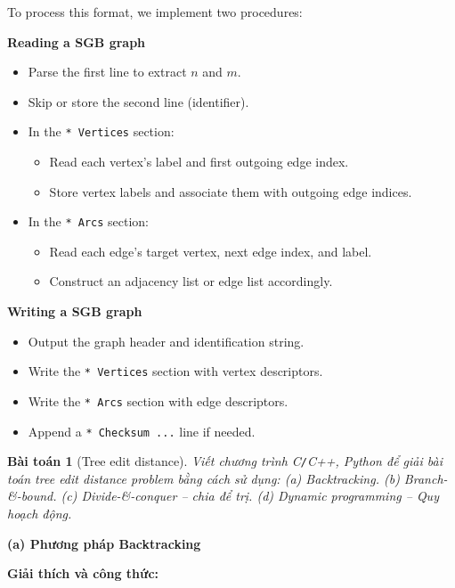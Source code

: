 \documentclass{article}
\newtheorem{baitoan}{Bài toán}
\begin{document}
To process this format, we implement two procedures:

\textbf{Reading a SGB graph}
\begin{itemize}
    \item Parse the first line to extract $n$ and $m$.
    \item Skip or store the second line (identifier).
    \item In the \texttt{* Vertices} section:
    \begin{itemize}
        \item Read each vertex’s label and first outgoing edge index.
        \item Store vertex labels and associate them with outgoing edge indices.
    \end{itemize}
    \item In the \texttt{* Arcs} section:
    \begin{itemize}
        \item Read each edge’s target vertex, next edge index, and label.
        \item Construct an adjacency list or edge list accordingly.
    \end{itemize}
\end{itemize}

\textbf{Writing a SGB graph}
\begin{itemize}
    \item Output the graph header and identification string.
    \item Write the \texttt{* Vertices} section with vertex descriptors.
    \item Write the \texttt{* Arcs} section with edge descriptors.
    \item Append a \texttt{* Checksum ...} line if needed.
\end{itemize}

\begin{baitoan}[Tree edit distance]
    Viết chương trình {\sf C{\tt/}C++, Python} để giải bài toán tree edit distance problem bằng cách sử dụng: (a) Backtracking. (b) Branch-\&-bound. (c) Divide-\&-conquer -- chia để trị. (d) Dynamic programming -- Quy hoạch động.
\end{baitoan}


\textbf{(a) Phương pháp Backtracking}

\textbf{Giải thích và công thức:}
\end{document}
